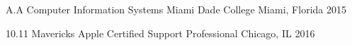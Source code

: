 

\begin{cventries}

  \cventry
    {A.A Computer Information Systems} %
    {Miami Dade College} %
    {Miami, Florida} %
    {2015} %

    \cventry
    {10.11 Mavericks} %
    {Apple Certified Support Professional} %
    {Chicago, IL} %
    {2016} %


\end{cventries}
